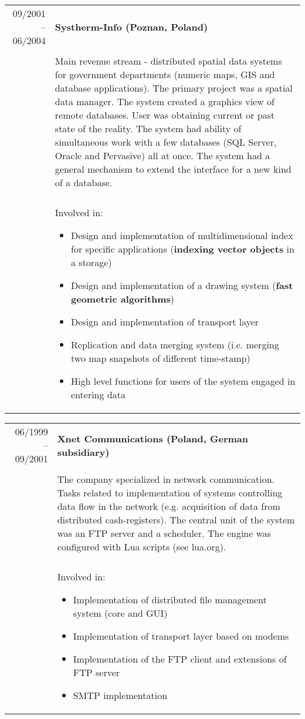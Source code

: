 \documentclass[a4paper,10pt]{article}
\begin{document}
\begin{tabular}{rp{11cm}}
09/2001 -- 06/2004 & \textbf{Systherm-Info (Poznan, Poland)}\\\\

& Main revenue stream - distributed spatial data systems for government departments (numeric maps, GIS and database applications).
The primary project was a spatial data manager. The system created a graphics view of remote databases. User was obtaining current or past state of the reality. The system had ability of simultaneous work with a few databases (SQL Server, Oracle and Pervasive) all at once. The system had a general mechanism to extend the interface for a new kind of a database.\\\\

& Involved in:
\begin{itemize}
\item Design and implementation of multidimensional index for specific applications (\textbf{indexing vector objects} in a storage)
\item Design and implementation of a drawing system (\textbf{fast geometric algorithms})
\item Design and implementation of transport layer
\item Replication and data merging system (i.e. merging two map snapshots of different time-stamp)
\item High level functions for users of the system engaged in entering data
\end{itemize}
\end{tabular}

\bigskip

\begin{tabular}{rp{11cm}}
06/1999 -- 09/2001 & \textbf{Xnet Communications (Poland, German subsidiary)}\\\\

& The company specialized in network communication. Tasks related to implementation of systems controlling data flow in the network (e.g. acquisition of data from distributed cash-registers). The central unit of the system was an FTP server and a scheduler. The engine was configured with Lua scripts (see lua.org).\\\\

& Involved in:
\begin{itemize}
\item Implementation of distributed file management system (core and GUI)
\item Implementation of transport layer based on modems
\item Implementation of the FTP client and extensions of FTP server
\item SMTP implementation
\end{itemize}
\end{tabular}
\end{document}
